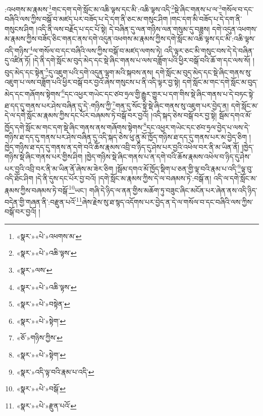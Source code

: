 :འཕགས་མ་རྣམས་\footnote{«སྣར་»«པེ་»འཕགས་མ་}གང་དག་དགེ་སློང་མ་འཆི་ལྟས་དང་མི་:འཆི་ལྟས་འདི་\footnote{«སྣར་»«པེ་»འཆི་ལྟས་}སྡེ་ཞིང་གནས་པ་ལ་\footnote{«སྣར་»ལས་}གསོལ་བ་དང་བཞིའི་ལས་ཀྱིས་བསྒོ་བ་མཛད་པར་བཟོད་པ་དེ་དག་ནི་ཅང་མ་གསུང་ཤིག །གང་དག་མི་བཟོད་པ་དེ་དག་ནི་གསུངས་ཤིག །འདི་ནི་ལས་བརྗོད་པ་དང་པོ་སྟེ། དེ་བཞིན་དུ་ལན་གཉིས་ལན་གསུམ་དུ་བཟླས། དགེ་འདུན་འཕགས་མ་རྣམས་ཀྱིས་བཟོད་ཅིང་གནང་ནས་དགེ་འདུན་འཕགས་མ་རྣམས་ཀྱིས་དགེ་སློང་མ་འཆི་ལྟས་དང་མི་:འཆི་ལྟས་འདི་གཉིས་\footnote{«སྣར་»«པེ་»འཆི་ལྟས་}ལ་གསོལ་བ་དང་བཞིའི་ལས་ཀྱིས་བསྒོ་བ་མཛད་ལགས་ཏེ། འདི་ལྟར་ཅང་མི་གསུང་བས་དེ་དེ་བཞིན་དུ་འཛིན་ཏོ། །དེ་ནི་དགེ་སློང་མ་བུད་མེད་དང་སྡེ་ཞིང་གནས་པ་ལས་བཟློག་པའི་ཕྱིར་བསྒོ་བའི་ཆོ་ག་དང་ལས་སོ། །བུད་མེད་དང་སྟེན་\footnote{«སྣར་»«པེ་»བསྟེན་}དུ་འཇུག་པའི་དགེ་འདུན་ལྷག་མའི་སྐབས་ནས། དགེ་སློང་མ་བུད་མེད་དང་སྡེ་ཞིང་གནས་སུ་འཇུག་པ་ལས་བཟློག་པའི་ཕྱིར་བསྒོ་བར་བྱའོ་ཞེས་གསུངས་པ་ནི་འདི་ལྟར་བྱ་སྟེ། དགེ་སློང་མ་གང་དགེ་སློང་མ་བུད་མེད་དང་གཞོགས་སྟེགས་\footnote{«སྣར་»«པེ་»སྟེག་}དང་འཕྱར་གཡེང་དང་ཙབ་ཧྲལ་གྱི་རྒྱུར་གྱུར་པ་དག་གིས་སྡེ་ཞིང་གནས་པ་དེ་བཏང་སྟེ་ཐ་དད་དུ་གནས་པར་ཤེས་བཞིན་དུ་དེ་:གཉིས་ཀྱི་\footnote{«ཅོ་»གཉིས་ཀྱིས་}གན་དུ་སོང་སྟེ་སྡེ་ཞིང་གནས་སུ་འཇུག་པར་བྱེད་ན། དགེ་སློང་མ་དེ་ལ་དགེ་སློང་མ་རྣམས་ཀྱིས་དང་པོར་བཞམས་ཏེ་བསྒོ་བར་བྱའོ། །འདི་སྐད་ཅེས་བསྒོ་བར་བྱ་སྟེ། སྦོམ་དགའ་མོ་ཁྱོད་དགེ་སློང་མ་གང་དག་སྡེ་ཞིང་གནས་ནས་གཞོགས་སྟེགས་\footnote{«སྣར་»«པེ་»སྟེག་}དང་འཕྱར་གཡེང་དང་ཙབ་ཧྲལ་བྱེད་པ་ལས་དེ་གཉིས་ཐ་དད་དུ་གནས་པར་ཤེས་བཞིན་དུ་འདི་སྐད་ཅེས་ཕུ་ནུ་མོ་ཁྱོད་གཉིས་ཐ་དད་དུ་གནས་པར་མ་བྱེད་ཅིག །ཁྱེད་གཉིས་ཐ་དད་དུ་གནས་ན་དགེ་བའི་ཆོས་རྣམས་འབྲི་བ་ཉིད་དུ་ཤེས་པར་བྱའི་འཕེལ་བར་ནི་མ་ཡིན་ནོ། །ཁྱེད་གཉིས་སྡེ་ཞིང་གནས་པར་གྱིས་ཤིག །ཁྱེད་གཉིས་སྡེ་ཞིང་གནས་པ་ན་དགེ་བའི་ཆོས་རྣམས་འཕེལ་བ་ཉིད་དུ་ཤེས་པར་བྱའི་འབྲི་བར་ནི་མ་ཡིན་ནོ་ཞེས་མ་ཟེར་ཅིག །སྦོམ་དགའ་མོ་ཁྱོད་སྡིག་པ་ཅན་གྱི་ལྟ་བའི་རྣམ་པ་འདི་\footnote{«སྣར་»འདི་ལྟ་བའི་རྣམ་པ་འདི་}ལྟ་བུ་འདི་ཐོང་ཤིག །དེ་ནི་དུས་དང་པོར་བྱ་བའོ། །དགེ་སློང་མ་རྣམས་ཀྱིས་དེ་ལ་བཞམས་ཏེ་:བསྒོ་ན། འདི་ལ་དགེ་སློང་མ་རྣམས་ཀྱིས་བཞམས་ཏེ་བསྒོ་\footnote{«སྣར་»«པེ་»བསྒོ་}ཡང་། གཞི་དེ་ཉིད་ལ་ནན་གྱིས་མཆོག་ཏུ་བཟུང་ཞིང་མངོན་པར་ཞེན་ནས་འདི་ཉིད་བདེན་གྱི་གཞན་ནི་:བརྫུན་པའོ་\footnote{«སྣར་»«པེ་»རྫུན་པའོ་}ཞེས་རྗེས་སུ་ཐ་སྙད་འདོགས་པར་བྱེད་ན་དེ་ལ་གསོལ་བ་དང་བཞིའི་ལས་ཀྱིས་བསྒོ་བར་བྱའོ། །
